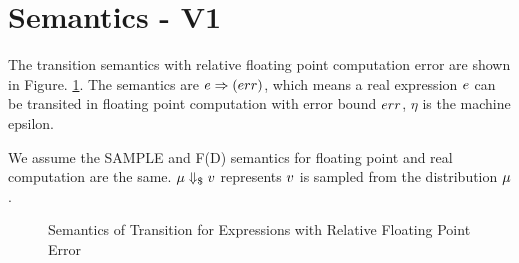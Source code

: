 \documentclass[a4paper,11pt]{article}
\begin{document}
\newpage
\section{Semantics - V1}

The transition semantics with relative floating point computation error are shown in Figure. \ref{fig_trans_semantics_exp}. The semantics are $e \Rightarrow (err)$, which means a real expression $e$ can be transited in floating point computation with error bound $err$, $\eta$ is the machine epsilon.

We assume the SAMPLE and F(D) semantics for floating point and real computation are the same. $\mu \Downarrow_{\$} v$ represents $v$ is sampled from the distribution $\mu$.

\begin{figure}
\caption{Semantics of Transition for Expressions with Relative Floating Point Error}
\label{fig_trans_semantics_exp}
\end{figure}
\end{document}
